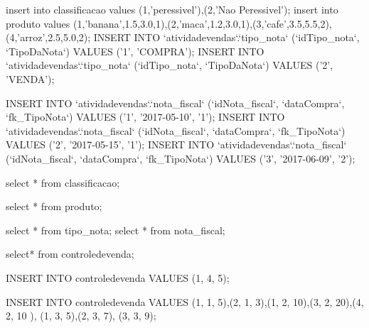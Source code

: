 insert into classificacao values (1,'peressivel'),(2,'Nao Peressivel'); 
insert into produto values (1,'banana',1.5,3.0,1),(2,'maca',1.2,3.0,1),(3,'cafe',3.5,5.5,2),(4,'arroz',2.5,5.0,2);
INSERT INTO `atividadevendas`.`tipo_nota` (`idTipo_nota`, `TipoDaNota`) VALUES ('1', 'COMPRA');
INSERT INTO `atividadevendas`.`tipo_nota` (`idTipo_nota`, `TipoDaNota`) VALUES ('2', 'VENDA');

INSERT INTO `atividadevendas`.`nota_fiscal` (`idNota_fiscal`, `dataCompra`, `fk_TipoNota`) VALUES ('1', '2017-05-10', '1');
INSERT INTO `atividadevendas`.`nota_fiscal` (`idNota_fiscal`, `dataCompra`, `fk_TipoNota`) VALUES ('2', '2017-05-15', '1');
INSERT INTO `atividadevendas`.`nota_fiscal` (`idNota_fiscal`, `dataCompra`, `fk_TipoNota`) VALUES ('3', '2017-06-09', '2');

select * from classificacao;

select * from produto;

select * from tipo_nota;
select * from nota_fiscal;

select* from controledevenda;

INSERT INTO controledevenda VALUES (1, 4, 5);

INSERT INTO controledevenda VALUES (1, 1, 5),(2, 1, 3),(1, 2, 10),(3, 2, 20),(4, 2, 10 ), (1, 3, 5),(2, 3, 7), (3, 3, 9);